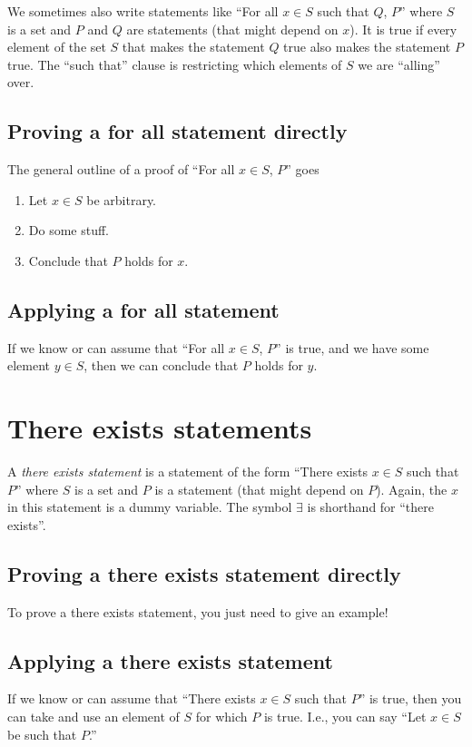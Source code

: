 \documentclass[12pt]{amsart}
\begin{document}
We sometimes also write statements like ``For all $x\in S$ such that $Q$, $P$'' where $S$ is a set and $P$ and $Q$ are statements (that might depend on $x$). It is true if every element of the set $S$ that makes the statement $Q$ true also makes the statement $P$ true. The ``such that'' clause is restricting which elements of $S$ we are ``alling'' over.


\subsection*{Proving a for all statement directly} The general outline of a proof of ``For all $x\in S$, $P$'' goes
\begin{enumerate}
\item Let $x\in S$ be arbitrary.
\item Do some stuff.
\item Conclude that $P$ holds for $x$.
\end{enumerate}




\subsection*{Applying a for all statement} If we know or can assume that ``For all $x\in S$, $P$'' is true, and we have some element $y\in S$, then we can conclude that $P$ holds for $y$.

\section*{There exists statements} A \emph{there exists statement} is a statement of the form ``There exists $x\in S$ such that $P$'' where $S$ is a set and $P$ is a statement (that might depend on $P$). Again, the $x$ in this statement is a dummy variable. The symbol $\exists$ is shorthand for ``there exists''.

\subsection*{Proving a there exists statement directly} To prove a there exists statement, you just need to give an example!

\subsection*{Applying a there exists statement}  If we know or can assume that ``There exists $x\in S$ such that $P$'' is true, then you can take and use an element of $S$ for which $P$ is true. I.e., you can say ``Let $x\in S$ be such that $P$.''
\end{document}
